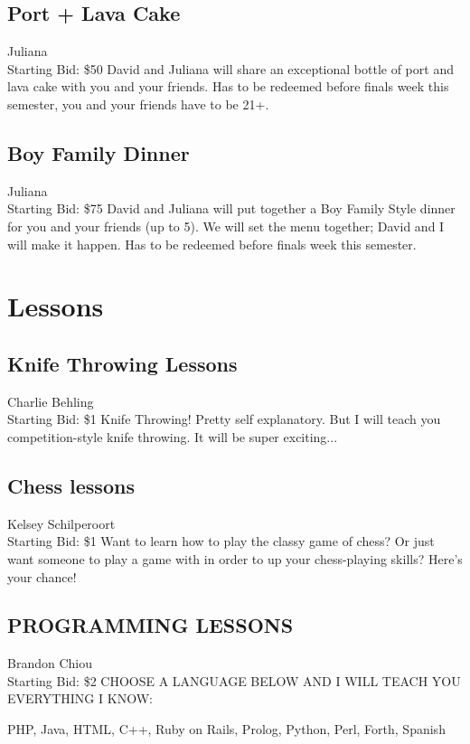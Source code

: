\documentclass[11pt]{article}
\begin{document}
\subsection{Port + Lava Cake}
Juliana
\\
Starting Bid: \$50
\newline
David and Juliana will share an exceptional bottle of port and lava cake with you and your friends. Has to be redeemed before finals week this semester, you and your friends have to be 21+.
\subsection{Boy Family Dinner}
Juliana
\\
Starting Bid: \$75
\newline
David and Juliana will put together a Boy Family Style dinner for you and your friends (up to 5). We will set the menu together; David and I will make it happen. Has to be redeemed before finals week this semester.
\section{Lessons}
\subsection{Knife Throwing Lessons}
Charlie Behling
\\
Starting Bid: \$1
\newline
Knife Throwing! Pretty self explanatory. But I will teach you competition-style knife throwing. It will be super exciting...
\subsection{Chess lessons}
Kelsey Schilperoort
\\
Starting Bid: \$1
\newline
Want to learn how to play the classy game of chess? Or just want someone to play a game with in order to up your chess-playing skills? Here's your chance!
\subsection{PROGRAMMING LESSONS}
Brandon Chiou
\\
Starting Bid: \$2
\newline
CHOOSE A LANGUAGE BELOW AND I WILL TEACH YOU EVERYTHING I KNOW:

PHP, Java, HTML, C++, Ruby on Rails, Prolog, Python, Perl, Forth, Spanish
\end{document}
